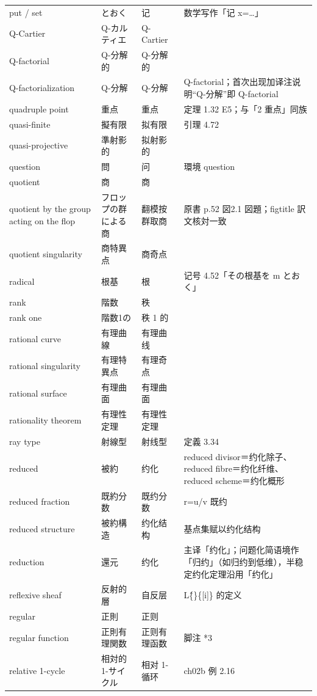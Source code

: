 \begin{longtable}{@{}>{\raggedright\arraybackslash}p{}>{\raggedright\arraybackslash}p{}>{\raggedright\arraybackslash}p{}>{\raggedright\arraybackslash}p{}@{}}
put / set & とおく & 记 & 数学写作「记 x=…」 \\
Q-Cartier & Q-カルティエ & Q-Cartier &  \\
Q-factorial & Q-分解的 & Q-分解的 &  \\
Q-factorialization & Q-分解 & Q-分解 & Q-factorial；首次出现加译注说明“Q-分解”即 Q-factorial \\
quadruple point & 4 重点 & 4 重点 & 定理 1.32 E5；与「2 重点」同族 \\
quasi-finite & 擬有限 & 拟有限 & 引理 4.72 \\
quasi-projective & 準射影的 & 拟射影的 &  \\
question & 問 & 问 & 環境 question \\
quotient & 商 & 商 &  \\
quotient by the group acting on the flop & フロップの群による商 & 翻模按群取商 & 原書 p.52 図2.1 図題；figtitle 訳文核対一致 \\
quotient singularity & 商特異点 & 商奇点 &  \\
radical & 根基 & 根 & 记号 4.52「その根基を m とおく」 \\
rank & 階数 & 秩 &  \\
rank one & 階数1の & 秩 1 的 &  \\
rational curve & 有理曲線 & 有理曲线 &  \\
rational singularity & 有理特異点 & 有理奇点 &  \\
rational surface & 有理曲面 & 有理曲面 &  \\
rationality theorem & 有理性定理 & 有理性定理 &  \\
ray type & 射線型 & 射线型 & 定義 3.34 \\
reduced & 被約 & 约化 & reduced divisor＝约化除子、reduced fibre＝约化纤维、reduced scheme＝约化概形 \\
reduced fraction & 既約分数 & 既约分数 & r=u/v 既约 \\
reduced structure & 被約構造 & 约化结构 & 基点集赋以约化结构 \\
reduction & 還元 & 约化 & 主译「约化」；问题化简语境作「归约」（如归约到低维），半稳定约化定理沿用「约化」 \\
reflexive sheaf & 反射的層 & 自反层 & L\^\{\}\{[i]\} 的定义 \\
regular & 正則 & 正则 &  \\
regular function & 正則有理関数 & 正则有理函数 & 4.66 脚注 *3 \\
relative 1-cycle & 相対的 1-サイクル & 相对 1-循环 & ch02b 例 2.16 \\

\end{longtable}
